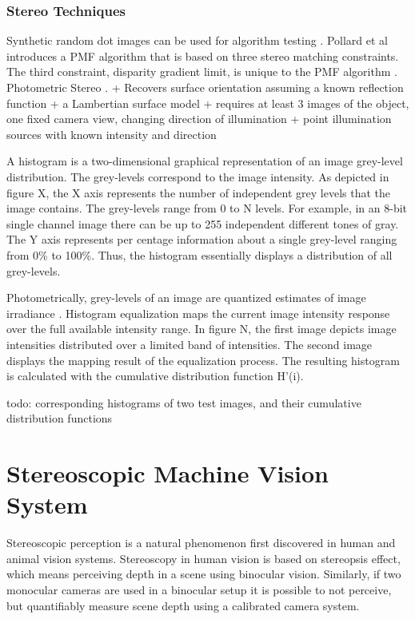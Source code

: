 \documentclass[12pt,a4paper,oneside,pdftex]{report}
\begin{document}
{\subsection{Stereo Techniques}


Synthetic random dot images can be used for algorithm testing \cite{Zitnick00}.
Pollard et al introduces a PMF algorithm that is based on three stereo matching constraints. The third constraint, disparity gradient limit, is unique to the PMF algorithm \cite{Sonka07}.
Photometric Stereo \cite{Woodham80}.
    + Recovers surface orientation assuming a known reflection function
    + a Lambertian surface model
    + requires at least 3 images of the object, one fixed camera view, changing direction of illumination
    + point illumination sources with known intensity and direction



A histogram is a two-dimensional graphical representation of an image grey-level distribution. The grey-levels correspond to the image intensity. As depicted in figure X, the X axis represents the number of independent grey levels that the image contains. The grey-levels range from 0 to N levels. For example, in an 8-bit single channel image there can be up to 255 independent different tones of gray. The Y axis represents per centage information about a single grey-level ranging from 0\% to 100\%. Thus, the histogram essentially displays a distribution of all grey-levels.

Photometrically, grey-levels of an image are quantized estimates of image irradiance \cite{Sonka07}.
Histogram equalization maps the current image intensity response over the full available intensity range. In figure N, the first image depicts image intensities distributed over a limited band of intensities. The second image displays the mapping result of the equalization process. The resulting histogram is calculated with the cumulative distribution function H'(i).

todo: corresponding histograms of two test images, and their cumulative distribution functions

\chapter{Stereoscopic Machine Vision System}
\label{chapter:stereographic_machine_vision_system}
Stereoscopic perception is a natural phenomenon first discovered in human and animal vision systems. Stereoscopy in human vision  is based on stereopsis effect, which means perceiving depth in a scene using binocular vision. Similarly, if two monocular cameras are used in a binocular setup it is possible to not perceive, but quantifiably measure scene depth using a calibrated camera system. %

}
\end{document}
